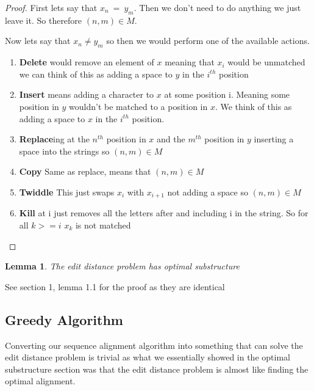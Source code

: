 \documentclass{article}
\newtheorem{lemma}{Lemma}[thm]
\begin{document}
					\begin{proof}
						First lets say that $x_n\ =\ y_m$. Then we don't need to do anything we just leave it. So therefore $(n,m) \in M$.\newline
						
						Now lets say that $x_n \ne y_m$ so then we would perform one of the available actions.
						
						\begin{enumerate}
							\item \textbf{Delete} would remove an element of $x$ meaning that $x_i$ would be unmatched we can think of this as adding a space to $y$ in the $i^{th}$ position
							\item \textbf{Insert} means adding a character to $x$ at some position i. Meaning some position in $y$ wouldn't be matched to a position in $x$. We think of this as adding a space to $x$ in the $i^{th}$ position. 
							\item \textbf{Replace}ing at the $n^{th}$ position in $x$ and the $m^{th}$ position in $y$ inserting a space into the strings so $(n,m) \in M$
							\item \textbf{Copy} Same as replace, means that $(n,m) \in M$
							\item \textbf{Twiddle} This just swaps $x_i$ with $x_{i+1}$ not adding a space so $(n,m) \in M$
							\item \textbf{Kill} at i just removes all the letters after and including i in the string. So for all $k >= i$ $x_k$ is not matched
						\end{enumerate} 					
					
					\end{proof}
					
					\begin{lemma}
						The edit distance problem has optimal substructure
					\end{lemma}
					
					See section 1, lemma 1.1 for the proof as they are identical						
					
				\subsection{Greedy Algorithm}
					Converting our sequence alignment algorithm into something that can solve the edit distance problem is trivial as what we essentially showed in the optimal substructure section was that the edit distance problem is almost like finding the optimal alignment.\newline
					
\end{document}
